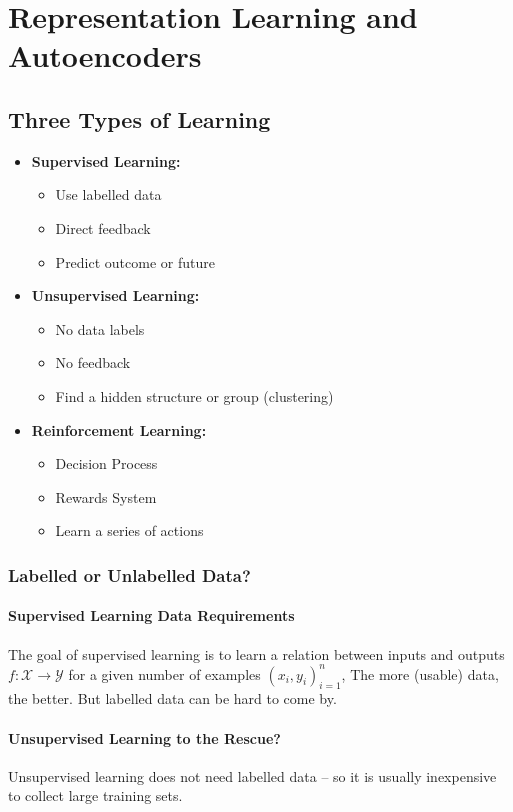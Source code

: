 \chapter{Representation Learning and Autoencoders}

\section{Three Types of Learning}
\begin{itemize}
    \item \textbf{Supervised Learning: } 
    \begin{itemize}
        \item Use labelled data
        \item Direct feedback
        \item Predict outcome or future
    \end{itemize}
    \item \textbf{Unsupervised Learning: } 
    \begin{itemize}
        \item No data labels
        \item No feedback
        \item Find a hidden structure or group (clustering)
    \end{itemize}
    \item \textbf{Reinforcement Learning: } 
    \begin{itemize}
        \item Decision Process
        \item Rewards System
        \item Learn a series of actions
    \end{itemize}
\end{itemize}

\subsection{Labelled or Unlabelled Data?}
\subsubsection{Supervised Learning Data Requirements}
The goal of supervised learning is to learn a relation between inputs and outputs $f:\mathcal{X}\to\mathcal{Y}$ for a given number of examples $(x_i,y_i)_{i=1}^n$, The more (usable) data, the better. But labelled data can be hard to come by.

\subsubsection{Unsupervised Learning to the Rescue?}
Unsupervised learning does not need labelled data – so it is usually inexpensive to collect large training sets.

